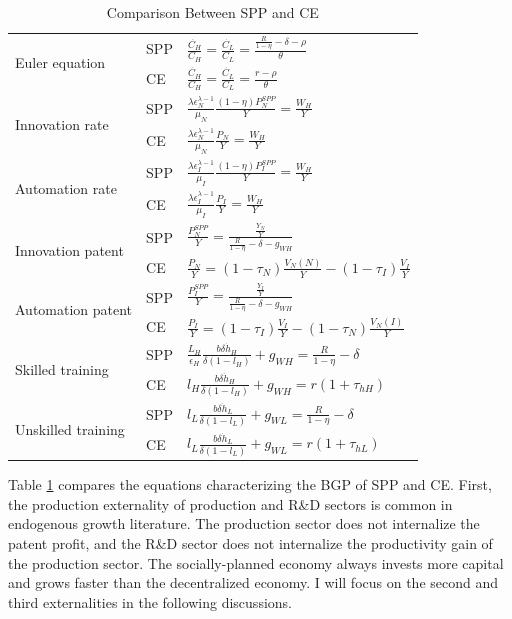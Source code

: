 \documentclass[12pt]{article}
\begin{document}
\begin{table}[h!]
\center
\scriptsize
\renewcommand{\arraystretch}{2}
\begin{tabular}{l|ll}
\hline \hline
\multirow{2}{*}{Euler equation} & SPP  &  
$\frac{\dot{C_H}}{C_H} = \frac{\dot{C_L}}{C_L} = \frac{\frac{R}{1-\eta}-\delta-\rho}{\theta}$ \\
& CE &$\frac{\dot{C_H}}{C_H} = \frac{\dot{C_L}}{C_L} = \frac{r-\rho}{\theta}$ \\\hline
\multirow{2}{*}{Innovation rate} & SPP  &  
$\frac{\lambda\epsilon_N^{\lambda-1}}{\mu_N}\frac{(1-\eta)P_N^{SPP}}{Y} = \frac{W_H}{Y} $  \\ 
& CE &$\frac{\lambda\epsilon_N^{\lambda-1}}{\mu_N}\frac{P_N}{Y}  = \frac{W_H}{Y}$ \\\hline
\multirow{2}{*}{Automation rate}  & SPP  &  
$ \frac{\lambda\epsilon_I^{\lambda-1}}{\mu_I}\frac{(1-\eta)P_I^{SPP}}{Y}  = \frac{W_H}{Y}$  \\
& CE &$ \frac{\lambda\epsilon_I^{\lambda-1}}{\mu_I}\frac{P_I}{Y}  = \frac{W_H}{Y}$ \\\hline
\multirow{2}{*}{Innovation patent} & SPP  &  
$\frac{P_N^{SPP}}{Y} = \frac{\frac{Y_N}{Y}}{\frac{R}{1-\eta}-\delta-g_{WH}}$  \\
& CE &$\frac{P_N}{Y} =(1-\tau_N)\frac{V_N(N)}{Y}-(1-\tau_I)\frac{V_I}{Y}$ \\\hline
\multirow{2}{*}{Automation patent} & SPP  &  
$\frac{P_I^{SPP}}{Y}= \frac{\frac{Y_I}{Y}}{\frac{R}{1-\eta}-\delta-g_{WH}}$  \\
& CE &$\frac{P_I}{Y}  =  (1-\tau_I)\frac{V_I}{Y}-(1-\tau_N)\frac{V_N(I)}{Y}$ \\\hline
\multirow{2}{*}{Skilled training} & SPP  &  
$\frac{L_H}{\epsilon_H}\frac{b\delta \dot{h}_H}{\delta(1-l_H)}+g_{WH} = \frac{R}{1-\eta}-\delta$  \\ 
& CE &$l_H\frac{b\delta \dot{h}_H}{\delta(1-l_H)}+g_{WH} =  r(1+\tau_{hH})$ \\\hline
\multirow{2}{*}{Unskilled training} & SPP  &  
$l_L\frac{b\delta \dot{h}_L}{\delta(1-l_L)}+g_{WL}= \frac{R}{1-\eta}-\delta$  \\ 
& CE &$l_L\frac{b\delta \dot{h}_L}{\delta(1-l_L)}+g_{WL}=  r(1+\tau_{hL})$ \\\hline
\end{tabular}
\renewcommand{\arraystretch}{1}
\caption{Comparison Between SPP and CE}
\label{SPP_CE}
\end{table}

Table \ref{SPP_CE} compares the equations characterizing the BGP of SPP and CE. First, the production externality of production and R\&D sectors is common in endogenous growth literature. The production sector does not internalize the patent profit, and the R\&D sector does not internalize the productivity gain of the production sector. The socially-planned economy always invests more capital and grows faster than the decentralized economy. I will focus on the second and third externalities in the following discussions.
\end{document}
